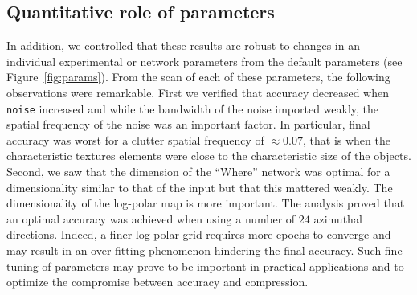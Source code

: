 \subsection*{Quantitative role of parameters}


In addition, we controlled that these results are robust to changes in an individual experimental or network parameters from the default parameters (see Figure~\ref{fig:params}). From the scan of each of these parameters, the following observations were remarkable. First we verified that accuracy decreased when \texttt{noise} increased and while the bandwidth of the noise imported weakly, the spatial frequency of the noise was an important factor. In particular, final accuracy was worst for a clutter spatial frequency of $\approx 0.07$, that is when the characteristic textures elements were close to the characteristic size of the objects. Second, we saw that the dimension of the ``Where'' network was optimal for a dimensionality similar to that of the input but that this mattered weakly. The dimensionality of the log-polar map is more important. The analysis proved that an optimal accuracy was achieved when using a number of $24$ azimuthal directions. Indeed, a finer log-polar grid requires more epochs to converge and may result in an over-fitting phenomenon hindering the final accuracy. Such fine tuning of parameters may prove to be important in practical applications and to optimize the compromise between accuracy and compression.
